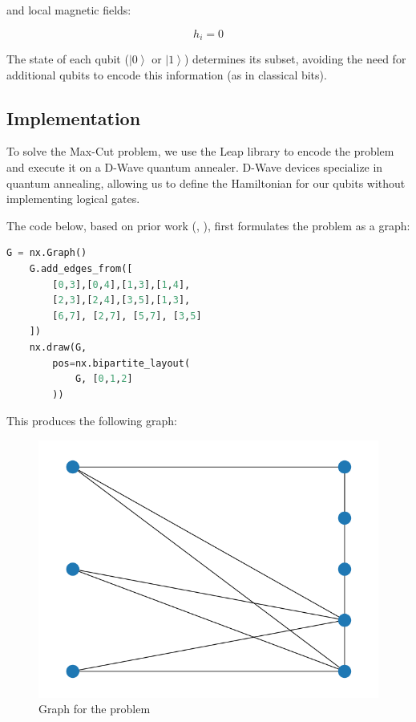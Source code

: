 \documentclass{article}
\begin{document}
\begin{multicols}{2}
and local magnetic fields:

\begin{equation}
    h_i = 0
\end{equation}

The state of each qubit (\( \left|0\right> \) or \( \left|1\right> \)) determines its subset, avoiding the need for additional qubits to encode this information (as in classical bits).

\subsection{Implementation}

To solve the Max-Cut problem, we use the Leap library to encode the problem and execute it on a D-Wave quantum annealer. D-Wave devices specialize in quantum annealing, allowing us to define the Hamiltonian for our qubits without implementing logical gates.

The code below, based on prior work (\cite{jain_solving_2021}, \cite{stechly_mstechlyquantum_tsp_tutorials_2024}), first formulates the problem as a graph:

\begin{lstlisting}[language=Python]
    G = nx.Graph()
    G.add_edges_from([
        [0,3],[0,4],[1,3],[1,4],
        [2,3],[2,4],[3,5],[1,3],
        [6,7], [2,7], [5,7], [3,5]
    ])
    nx.draw(G, 
        pos=nx.bipartite_layout(
            G, [0,1,2]
        ))
\end{lstlisting}

This produces the following graph:

\begin{figure}[H]
    \centering
    \includegraphics[width = \columnwidth]{fig/oriented_graph.png}
    \caption{Graph for the problem}
    \label{fig:Graph_problem}
\end{figure}


\end{multicols}
\end{document}
